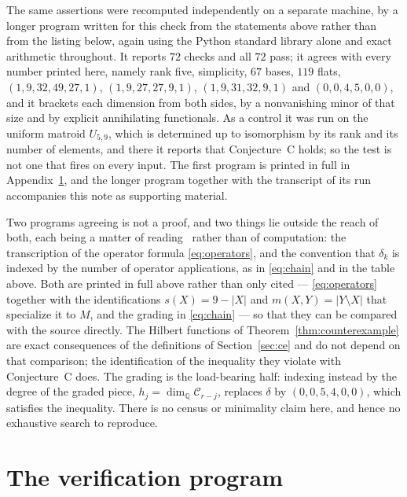 \documentclass[11pt]{amsart}
\theoremstyle{remark}
\begin{document}
The same assertions were recomputed independently on a separate machine, by a
longer program written for this check from the statements above rather than
from the listing below, again using the Python standard library alone and
exact arithmetic throughout. It reports $72$ checks and all $72$ pass; it
agrees with every number printed here, namely rank five, simplicity, $67$
bases, $119$ flats, $(1,9,32,49,27,1)$, $(1,9,27,27,9,1)$, $(1,9,31,32,9,1)$
and $(0,0,4,5,0,0)$, and it brackets each dimension from both sides, by a
nonvanishing minor of that size and by explicit annihilating functionals. As a
control it was run on the uniform matroid $U_{5,9}$, which is determined up to
isomorphism by its rank and its number of elements, and there it reports that
Conjecture~C holds; so the test is not one that fires on every input. The
first program is printed in full in Appendix~\ref{app:code}, and the longer
program together with the transcript of its run accompanies this note as
supporting material.

Two programs agreeing is not a proof, and two things lie outside the reach of
both, each being a matter of reading~\cite{Sinclair} rather than of
computation: the transcription of the operator formula \eqref{eq:operators},
and the convention that $\delta_k$ is indexed by the number of operator
applications, as in \eqref{eq:chain} and in the table above. Both are printed
in full above rather than only cited --- \eqref{eq:operators} together with the
identifications $s(X)=9-|X|$ and $m(X,Y)=|Y\setminus X|$ that specialize it to
$M$, and the grading in \eqref{eq:chain} --- so that they can be compared with
the source directly. The Hilbert functions of
Theorem~\ref{thm:counterexample} are exact consequences of the definitions of
Section~\ref{sec:ce} and do not depend on that comparison; the identification
of the inequality they violate with Conjecture~C does. The grading is the
load-bearing half: indexing instead by the degree of the graded piece,
$h_j=\dim_{\mathbb Q}\mathcal C_{r-j}$, replaces $\delta$ by $(0,0,5,4,0,0)$,
which satisfies the inequality. There is no census or minimality claim here,
and hence no exhaustive search to reproduce.

\raggedbottom

\appendix

\section{The verification program}\label{app:code}
\end{document}
